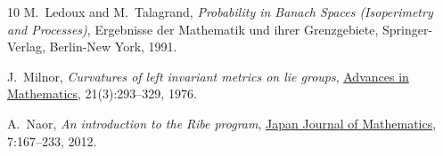 \documentclass[11pt,a4paper,reqno]{amsart}
\numberwithin{equation}{section}
\theoremstyle{plain}
\theoremstyle{definition}
\begin{document}
\begin{thebibliography}{10}
M.~Ledoux and M.~Talagrand, {\em Probability in Banach Spaces
  (Isoperimetry and Processes)}, Ergebnisse der Mathematik und ihrer
  Grenzgebiete, Springer-Verlag, Berlin-New York, 1991.

J.~Milnor, {\em Curvatures of left invariant metrics on lie groups},
  \href{http://dx.doi.org/10.1016/S0001-8708(76)80002-3}{Advances in
  Mathematics}, 21(3):293--329, 1976.

A.~Naor, {\em An introduction to the Ribe program},
\href{http://dx.doi.org/10.1007/s11537-012-1222-7}{Japan Journal of
Mathematics}, 7:167--233, 2012.

\end{thebibliography}
\end{document}
